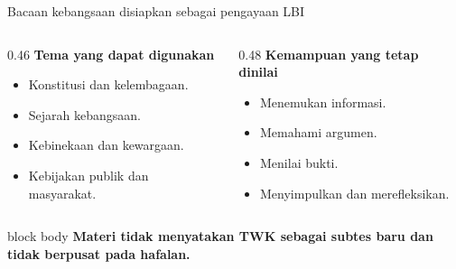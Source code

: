 \begin{frame}{Bacaan kebangsaan disiapkan sebagai pengayaan LBI}
  \begin{columns}[T,onlytextwidth]
    \begin{column}{0.46\textwidth}
      {\color{StudentBlue}\bfseries Tema yang dapat digunakan}\par
      \begin{itemize}
        \item Konstitusi dan kelembagaan.
        \item Sejarah kebangsaan.
        \item Kebinekaan dan kewargaan.
        \item Kebijakan publik dan masyarakat.
      \end{itemize}
    \end{column}
    \begin{column}{0.48\textwidth}
      {\color{StudentBlue}\bfseries Kemampuan yang tetap dinilai}\par
      \begin{itemize}
        \item Menemukan informasi.
        \item Memahami argumen.
        \item Menilai bukti.
        \item Menyimpulkan dan merefleksikan.
      \end{itemize}
    \end{column}
  \end{columns}
  \vspace{0.16cm}
  \begin{beamercolorbox}[rounded=true,sep=0.18cm,wd=\textwidth]{block body}
    \centering\bfseries Materi tidak menyatakan TWK sebagai subtes baru dan tidak berpusat pada hafalan.
  \end{beamercolorbox}
\end{frame}

